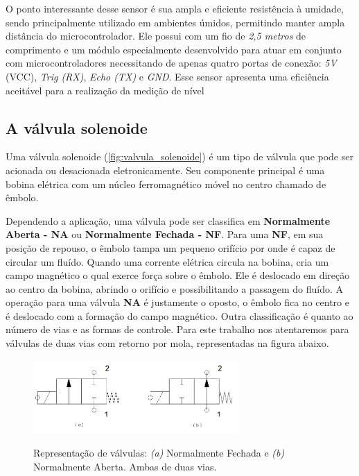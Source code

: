 O ponto interessante desse sensor é sua ampla e eficiente resistência à umidade, sendo principalmente utilizado em ambientes úmidos, permitindo manter ampla distância do microcontrolador. Ele possui com um fio de \textit{2,5 metros} de comprimento e um módulo especialmente desenvolvido para atuar em conjunto com microcontroladores necessitando de apenas quatro portas de conexão: \textit{5V} (VCC), \textit{Trig (RX)}, \textit{Echo (TX)} e \textit{GND}. Esse sensor apresenta uma eficiência aceitável para a realização da medição de nível


\subsection{A válvula solenoide}

Uma válvula solenoide (\autoref{fig:valvula_solenoide}) é um tipo de válvula que pode ser acionada ou desacionada eletronicamente. Seu componente principal é uma bobina elétrica com um núcleo ferromagnético móvel no centro chamado de êmbolo.

Dependendo a aplicação, uma válvula pode ser classifica em \textbf{Normalmente Aberta - NA} ou\textbf{ Normalmente Fechada - NF}. Para uma \textbf{NF}, em sua posição de repouso, o êmbolo tampa um pequeno orifício por onde é capaz de circular um fluído. Quando uma corrente elétrica circula na bobina, cria um campo magnético o qual exerce força sobre o êmbolo. Ele é deslocado em direção ao centro da bobina, abrindo o orifício e possibilitando a passagem do fluído. A operação para uma válvula \textbf{NA} é justamente o oposto, o êmbolo fica no centro e é deslocado com a formação do campo magnético. Outra classificação é quanto ao número de vias e as formas de controle. Para este trabalho nos atentaremos para válvulas de duas vias com retorno por mola, representadas na figura abaixo.

\begin{figure}[H]
	\centering
	\caption{Representação de válvulas: \textit{(a)} Normalmente Fechada  e \textit{(b)} Normalmente Aberta. Ambas de duas vias.}
	\includegraphics[width=0.7\textwidth]{figuras/valvulas.png}
	\label{fig:valvulas}
\end{figure}

